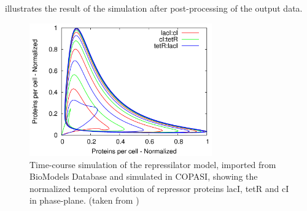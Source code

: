  illustrates the result of the simulation after post-processing of the output data. 
\begin{figure}
\centering
\includegraphics[width=0.7\textwidth]{images/simEx2.png}
\caption{Time-course simulation of the repressilator model, imported from BioModels Database and simulated in COPASI, showing the normalized temporal evolution of repressor proteins lacI, tetR and cI in phase-plane. (taken from \cite{Waltemath:2011})}
\label{fig:simEx2}
\end{figure}

